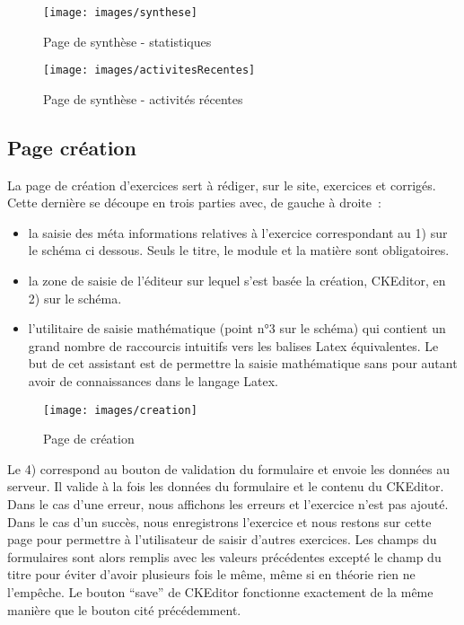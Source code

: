 \newpage 
\begin{figure}[!hH]
\begin{center}
\texttt{[image: images/synthese]}
\caption{Page de synthèse - statistiques}
\end{center}
\end{figure}

\begin{figure}[!hH]
\begin{center}
\texttt{[image: images/activitesRecentes]}
\caption{Page de synthèse - activités récentes}
\end{center}
\end{figure}

\subsection{Page création}

La page de création d'exercices sert à rédiger, sur le site, exercices et corrigés. Cette dernière se découpe en trois parties avec, de gauche à droite~:
\begin{itemize}
\item la saisie des méta informations relatives à l'exercice correspondant au 1) sur le schéma ci dessous. Seuls le titre, le module et la matière sont obligatoires.
\item la zone de saisie de l'éditeur sur lequel s'est basée la création, CKEditor, en 2) sur le schéma.
\item l'utilitaire de saisie mathématique (point n°3 sur le schéma) qui contient un grand nombre de raccourcis intuitifs vers les balises Latex équivalentes. Le but de cet assistant est de permettre la saisie mathématique sans pour autant avoir de connaissances dans le langage Latex.
\end{itemize}

\begin{figure}[!hH]
\texttt{[image: images/creation]}
\caption{Page de création}
\end{figure}

Le 4) correspond au bouton de validation du formulaire et envoie les données au serveur. Il valide à la fois les données du formulaire et le contenu du CKEditor. Dans le cas d'une erreur, nous affichons les erreurs et l'exercice n'est pas ajouté. Dans le cas d'un succès, nous enregistrons l'exercice et nous restons sur cette page pour permettre à l'utilisateur de saisir d'autres exercices. Les champs du formulaires sont alors remplis avec les valeurs précédentes excepté le champ du titre pour éviter d'avoir plusieurs fois le même, même si en théorie rien ne l'empêche. Le bouton \enquote{save} de CKEditor fonctionne exactement de la même manière que le bouton cité précédemment. 

